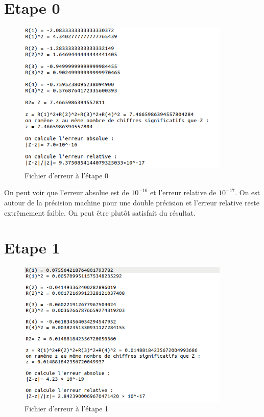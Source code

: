 \documentclass[12,french]{report}
\begin{document}
\section{Etape 0}

\begin{figure}[H]
	\center
	\includegraphics[width=0.9\textwidth]{./Images/r_0_err}
	\caption{Fichier d'erreur à l'étape 0}
\end{figure}

On peut voir que l'erreur absolue est de $10^{-16}$ et l'erreur relative de $10^{-17}$. On est autour de la précision machine pour une double précision et l'erreur relative reste extrêmement faible. On peut être plutôt satisfait du résultat.

\section{Etape 1}

\begin{figure}[H]
	\center
	\includegraphics[width=0.9\textwidth]{./Images/r_1_err}
	\caption{Fichier d'erreur à l'étape 1}
\end{figure}
\end{document}
